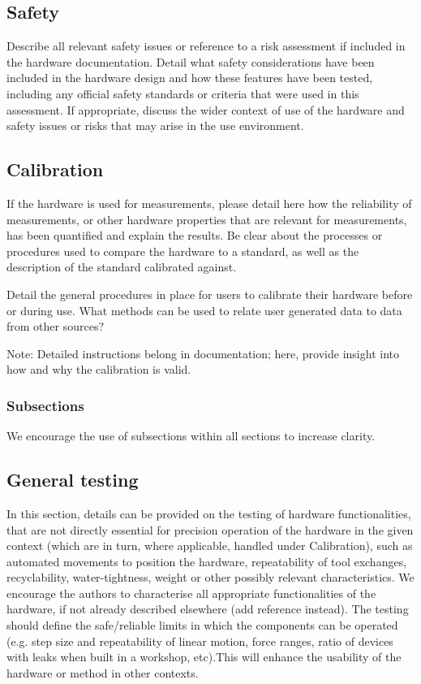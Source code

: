 \documentclass[a4paper]{article}
\begin{document}
\subsection{Safety}\label{h.v60aduckfisj}

Describe all relevant safety issues or reference to a risk assessment
if included in the hardware documentation. Detail what safety
considerations have been included in the hardware design and how these
features have been tested, including any official safety standards or
criteria that were used in this assessment. If appropriate, discuss the
wider context of use of the hardware and safety issues or risks that may
arise in the use environment.


\subsection{Calibration}\label{h.kr90wh14sxr5}

If the hardware is used for measurements, please detail here how the
reliability of measurements, or other hardware properties that are
relevant for measurements, has been quantified and explain the
results. Be clear about the processes or procedures used to compare the
hardware to a standard, as well as the description of the standard
calibrated against.

Detail the general procedures in place for users to calibrate their
hardware before or during use. What methods can be used to relate user
generated data to data from other sources? 

Note: Detailed instructions belong in documentation; here, provide
insight into how and why the calibration is valid.


\subsubsection{Subsections}\label{h.6mrkl1u5j8xc}

We encourage the use of subsections within all sections to increase
clarity.


\subsection{General testing}\label{h.wbekh9ay82yu}

In this section, details can be provided on the testing of hardware
functionalities, that are not directly essential for precision
operation of the hardware in the given context (which are in turn,
where applicable, handled under Calibration), such as automated
movements to position the hardware, repeatability of tool exchanges,
recyclability, water-tightness, weight or other possibly relevant
characteristics. We encourage the authors to characterise all
appropriate functionalities of the hardware, if not already described
elsewhere (add reference instead). The testing should define the
safe/reliable limits in which the components can be operated (e.g. step
size and repeatability of linear motion, force ranges, ratio of devices
with leaks when built in a workshop, etc).This will enhance the
usability of the hardware or method in other contexts.
\end{document}
